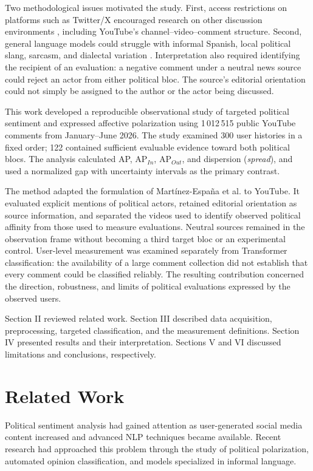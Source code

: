 \documentclass[conference,letterpaper]{IEEEtran}
\begin{document}
Two methodological issues motivated the study. First, access restrictions on platforms such as Twitter/X encouraged research on other discussion environments \cite{ANTONAKAKI2021114006}, including YouTube's channel--video--comment structure. Second, general language models could struggle with informal Spanish, local political slang, sarcasm, and dialectal variation \cite{10.1145/3446132.3446424,robertuito}. Interpretation also required identifying the recipient of an evaluation: a negative comment under a neutral news source could reject an actor from either political bloc. The source's editorial orientation could not simply be assigned to the author or the actor being discussed.

This work developed a reproducible observational study of targeted political sentiment and expressed affective polarization using 1\,012\,515 public YouTube comments from January--June 2026. The study examined 300 user histories in a fixed order; 122 contained sufficient evaluable evidence toward both political blocs. The analysis calculated AP, $\mathrm{AP}_{In}$, $\mathrm{AP}_{Out}$, and dispersion (\textit{spread}), and used a normalized gap with uncertainty intervals as the primary contrast.

The method adapted the formulation of Martínez-España et al. \cite{polariz} to YouTube. It evaluated explicit mentions of political actors, retained editorial orientation as source information, and separated the videos used to identify observed political affinity from those used to measure evaluations. Neutral sources remained in the observation frame without becoming a third target bloc or an experimental control. User-level measurement was examined separately from Transformer classification: the availability of a large comment collection did not establish that every comment could be classified reliably. The resulting contribution concerned the direction, robustness, and limits of political evaluations expressed by the observed users.

Section II reviewed related work. Section III described data acquisition, preprocessing, targeted classification, and the measurement definitions. Section IV presented results and their interpretation. Sections V and VI discussed limitations and conclusions, respectively.

\section{Related Work}
Political sentiment analysis had gained attention as user-generated social media content increased and advanced NLP techniques became available. Recent research had approached this problem through the study of political polarization, automated opinion classification, and models specialized in informal language.
\end{document}
